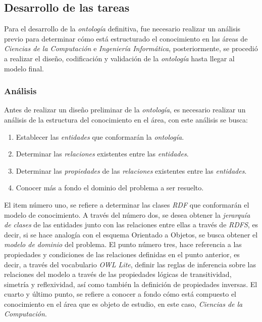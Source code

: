 \begin{itemize}
\subsection{Desarrollo de las tareas}
Para el desarrollo de la \textit{ontología} definitiva, fue necesario realizar un análisis previo para determinar cómo está estructurado el conocimiento en las áreas de \textit{Ciencias de la Computación} e \textit{Ingeniería Informática}, posteriormente, se procedió a realizar el diseño, codificación y validación de la \textit{ontología} hasta llegar al modelo final.

\subsubsection{Análisis}
Antes de realizar un diseño preliminar de la \textit{ontología}, es necesario realizar un análisis de la estructura del conocimiento en el área, con este análisis se busca:

\begin{enumerate}
    \item Establecer las \textit{entidades} que conformarán la \textit{ontología}.
    \item Determinar las \textit{relaciones} existentes entre las \textit{entidades}.
    \item Determinar las \textit{propiedades} de las \textit{relaciones} existentes entre las \textit{entidades}.
    \item Conocer más a fondo el dominio del problema a ser resuelto.
\end{enumerate}

El item número uno, se refiere a determinar las clases \textit{RDF} que conformarán el modelo de conocimiento. A través del número dos, se desea obtener la \textit{jerarquía de clases} de las entidades junto con las relaciones entre ellas a través de \textit{RDFS}, es decir, si se hace analogía con el esquema Orientado a Objetos, se busca obtener el \textit{modelo de dominio} del problema. El punto número tres, hace referencia a las propiedades y condiciones de las relaciones definidas en el punto anterior, es decir, a través del vocabulario \textit{OWL Lite}, definir las reglas de inferencia sobre las relaciones del modelo a través de las propiedades lógicas de transitividad, simetría y reflexividad, así como también la definición de propiedades inversas. El cuarto y último punto, se refiere a conocer a fondo cómo está compuesto el conocimiento en el área que es objeto de estudio, en este caso, \textit{Ciencias de la Computación}.


\end{itemize}
